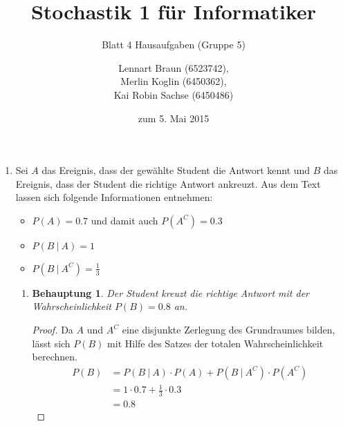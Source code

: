 \documentclass[a4paper]{scrartcl}
\title{Stochastik 1 für Informatiker}
\subtitle{Blatt 4 Hausaufgaben (Gruppe 5)}
\author{
    Lennart Braun (6523742), \\
    Merlin Koglin (6450362), \\
    Kai Robin Sachse (6450486)
}
\date{zum 5. Mai 2015}
\newtheorem*{behaupt}{Behauptung}
\begin{document}
\maketitle

\begin{enumerate}[label=\bfseries\arabic*.]
    \item
        Sei $A$ das Ereignis, dass der gewählte Student die Antwort kennt und
        $B$ das Ereignis, dass der Student die richtige Antwort ankreuzt.
        Aus dem Text lassen sich folgende Informationen entnehmen:
        \begin{itemize}
            \item $P(A) = \num{0.7}$ und damit auch $P(A^C) = \num{0.3}$
            \item $P(B\ |\ A) = 1$
            \item $P(B\ |\ A^C) = \frac{1}{3}$
        \end{itemize}
        \begin{enumerate}[label=(\alph*)]
            \item
                \begin{behaupt}
                    Der Student kreuzt die richtige Antwort mit der
                    Wahrscheinlichkeit $P(B) = \num{0.8}$ an.
                \end{behaupt}
                \begin{proof}
                    Da $A$ und $A^C$ eine disjunkte Zerlegung des
                    Grundraumes bilden, lässt sich $P(B)$ mit Hilfe des Satzes
                    der totalen Wahrscheinlichkeit berechnen.
                    \begin{equation*}
                        \begin{split}
                            P(B) &= P(B\ |\ A) \cdot P(A)
                                    + P(B\ |\ A^C) \cdot P(A^C) \\
                                 &= 1 \cdot \num{0.7}
                                    + \frac{1}{3} \cdot \num{0.3} \\
                                 &= \num{0.8}
                        \end{split}
                    \end{equation*}
                \end{proof}


\end{enumerate}
\end{enumerate}
\end{document}
